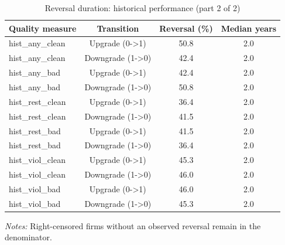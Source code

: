 \begin{table}[htbp]
\footnotesize
\centering
\caption{Reversal duration: historical performance (part 2 of 2)}
\begin{threeparttable}
\begin{tabular}{p{}ccc}
\toprule
Quality measure & Transition & Reversal (\%) & Median years \\
\midrule
hist\_any\_clean & Upgrade (0->1) & 50.8 & 2.0 \\
hist\_any\_clean & Downgrade (1->0) & 42.4 & 2.0 \\
hist\_any\_bad & Upgrade (0->1) & 42.4 & 2.0 \\
hist\_any\_bad & Downgrade (1->0) & 50.8 & 2.0 \\
hist\_rest\_clean & Upgrade (0->1) & 36.4 & 2.0 \\
hist\_rest\_clean & Downgrade (1->0) & 41.5 & 2.0 \\
hist\_rest\_bad & Upgrade (0->1) & 41.5 & 2.0 \\
hist\_rest\_bad & Downgrade (1->0) & 36.4 & 2.0 \\
hist\_viol\_clean & Upgrade (0->1) & 45.3 & 2.0 \\
hist\_viol\_clean & Downgrade (1->0) & 46.0 & 2.0 \\
hist\_viol\_bad & Upgrade (0->1) & 46.0 & 2.0 \\
hist\_viol\_bad & Downgrade (1->0) & 45.3 & 2.0 \\
\bottomrule
\end{tabular}
\begin{tablenotes}\footnotesize
\item \raggedright \textit{Notes:} Right-censored firms without an observed reversal remain in the denominator.
\end{tablenotes}
\end{threeparttable}
\end{table}
